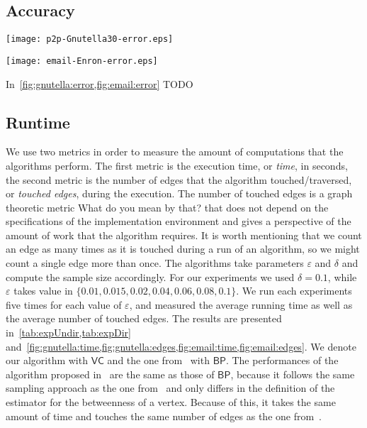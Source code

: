 \subsection{Accuracy}\label{sec:accuracy}

\begin{figure*}
\begin{minipage}[b]{0.5\linewidth}
\flushleft
\texttt{[image: p2p-Gnutella30-error.eps]}
\caption{\XXX} \label{fig:gnutella:error}
\end{minipage}%
\begin{minipage}[b]{0.5\linewidth}
\centering
\texttt{[image: email-Enron-error.eps]}
\caption{\XXX} \label{fig:email:error}
\end{minipage}
\end{figure*}
In~\cref{fig:gnutella:error,fig:email:error} \XXX TODO

\subsection{Runtime}\label{sec:runtime}
We use two metrics in order to measure the amount of computations that the
algorithms perform. The first metric is the execution time, or \textit{time}, in
seconds, the second metric is the number of edges that the algorithm
touched/traversed, or \textit{touched edges}, during the execution.  The number
of touched edges is a graph theoretic metric \XXX What do you mean by that? that
does not depend on the specifications of the implementation environment and
gives a perspective of the amount of work that the algorithm requires. It is
worth mentioning that we count an edge as many times as it is touched during
a run of an algorithm, so we might count a single edge more than once. The
algorithms take parameters $\varepsilon$ and $\delta$ and compute the sample
size accordingly. For our experiments we used $\delta=0.1$, while $\varepsilon$
takes value in $\{0.01, 0.015, 0.02, 0.04, 0.06, 0.08, 0.1\}$. We run each
experiments five times for each value of $\varepsilon$, and measured the average
running time as well as the average number of touched edges. 
The results are presented in~\cref{tab:expUndir,tab:expDir}
and~\cref{fig:gnutella:time,fig:gnutella:edges,fig:email:time,fig:email:edges}.
We denote our algorithm with $\mathsf{VC}$ and the one from~\citep{BrandesP07}
with $\mathsf{BP}$. The performances of the algorithm proposed
in~\citep{GeisbergerSS08} are the same as those of $\mathsf{BP}$, because it
follows the same sampling approach as the one
from~\citep{BrandesP07,JacobKLPT05} and only differs in the definition of the
estimator for the betweenness of a vertex. Because of this, it takes the same
amount of time and touches the same number of edges as the one
from~\citep{BrandesP07}.

